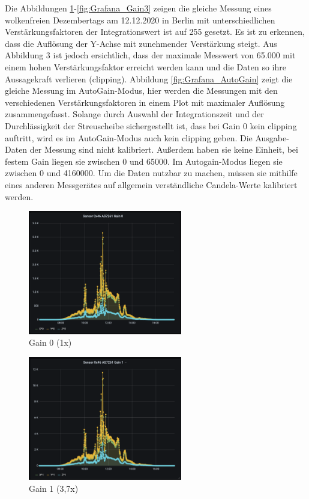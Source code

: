 Die Abbildungen \ref{fig:Grafana_Gain0}-\ref{fig:Grafana_Gain3} zeigen die gleiche Messung eines wolkenfreien Dezembertags am 12.12.2020 in Berlin mit unterschiedlichen Verstärkungsfaktoren der Integrationswert ist auf 255 gesetzt.
Es ist zu erkennen, dass die Auflösung der Y-Achse mit zunehmender Verstärkung steigt. Aus Abbildung 3 ist jedoch ersichtlich, dass der maximale Messwert von 65.000 mit einem hohen Verstärkungsfaktor erreicht werden kann und die Daten so ihre Aussagekraft verlieren (clipping).
Abbildung \ref{fig:Grafana_AutoGain} zeigt die gleiche Messung im AutoGain-Modus, hier werden die Messungen mit den verschiedenen Verstärkungsfaktoren in einem Plot mit maximaler Auflösung zusammengefasst.
Solange durch Auswahl der Integrationszeit und der Durchlässigkeit der Streuscheibe sichergestellt ist, dass bei Gain 0 kein clipping auftritt, wird es im AutoGain-Modus auch kein clipping geben.
Die Ausgabe-Daten der Messung sind nicht kalibriert.
Außerdem haben sie keine Einheit, bei festem Gain liegen sie zwischen 0 und 65000.
Im Autogain-Modus liegen sie zwischen 0 und 4160000.
Um die Daten nutzbar zu machen, müssen sie mithilfe eines anderen Messgerätes auf allgemein verständliche Candela-Werte kalibriert werden.

\begin{figure}[H]
\centering
\includegraphics[width=0.6\textwidth]{img/Grafana-Gain0}
\caption{Gain 0 (1x)}
\label{fig:Grafana_Gain0}
\end{figure}

\begin{figure}[H]
\centering
\includegraphics[width=0.6\textwidth]{img/Grafana-Gain1}
\caption{Gain 1 (3,7x)}
\label{fig:Grafana_Gain1}
\end{figure}

